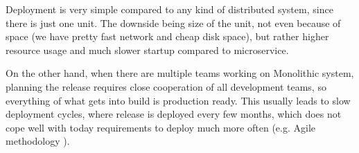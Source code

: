 Deployment is very simple compared to any kind of distributed system, since there is just one unit. The downside being size of the unit, not even because of space (we have pretty fast network and cheap disk space), but rather higher resource usage and much slower startup compared to microservice.

On the other hand, when there are multiple teams working on Monolithic system, planning the release requires close cooperation of all development teams, so everything of what gets into build is production ready. This usually leads to slow deployment cycles, where release is deployed every few months, which does not cope well with today requirements to deploy much more often (e.g. Agile methodology \cite{AGILE_MANIFESTO}).

